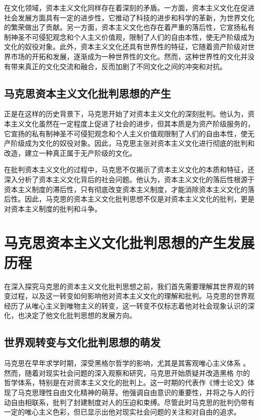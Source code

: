 \documentclass[a4paper]{ctexart}
\begin{document}
在文化领域，资本主义文化同样存在着深刻的矛盾。一方面，资本主义文化在促进社会发展方面具有一定的进步性，它推动了科技的进步和科学的革新，为世界文化的繁荣做出了贡献。另一方面，资本主义文化也存在着严重的落后性，它宣扬私有制神圣不可侵犯观念和个人主义价值观，限制了人们的自由本性，使无产阶级成为文化的奴役对象。此外，资本主义文化还具有世界性的特征，它随着资产阶级对世界市场的开拓和发展，逐渐成为一种世界性的文化。然而，这种世界性的文化并没有带来真正的文化交流和融合，反而加剧了不同文化之间的冲突和对抗。
\subsection{马克思资本主义文化批判思想的产生}


正是在这样的历史背景下，马克思开始了对资本主义文化的深刻批判。他认为，资本主义文化虽然在一定程度上促进了社会的进步，但其本质是为资产阶级服务的，它宣扬的私有制神圣不可侵犯观念和个人主义价值观限制了人们的自由本性，使无产阶级成为文化的奴役对象。因此，马克思主张对资本主义文化进行彻底的批判和改造，建立一种真正属于无产阶级的文化。

在批判资本主义文化的过程中，马克思不仅揭示了资本主义文化的本质和特征，还深入分析了资本主义文化背后的社会问题。他认为，资本主义文化的落后性根源于资本主义制度的滞后性，只有彻底改变资本主义制度，才能消除资本主义文化的落后性。因此，马克思的资本主义文化批判思想不仅是对资本主义文化的批判，更是对资本主义制度的批判和斗争。

\newpage
\section{马克思资本主义文化批判思想的产生发展历程}
在深入探究马克思的资本主义文化批判思想之前，我们首先需要理解其世界观的转变过程，以及这一转变如何影响他对资本主义文化的理解和批判。马克思的世界观经历了从唯心主义到唯物主义的转变，这一转变不仅标志着他对社会现象认识的深化，也决定了他文化批判思想的发展方向。
\subsection{世界观转变与文化批判思想的萌发}
马克思在早年求学时期，深受黑格尔哲学的影响，尤其是其客观唯心主义体系
。然而，随着对现实社会问题的深入观察和研究，马克思开始质疑并改造黑格
尔的哲学体系，特别是在对资本主义文化的批判上。这一时期的代表作《博士论文》体现了马克思理性自由文化精神的萌芽。他强调自由意识的重要性，并将之与人的行动自由相联系，批判了封建制度对人的压迫和束缚。尽管此时马克思的批判仍带有一定的唯心主义色彩，但已显示出他对现实社会问题的关注和对自由的追求。
\end{document}
